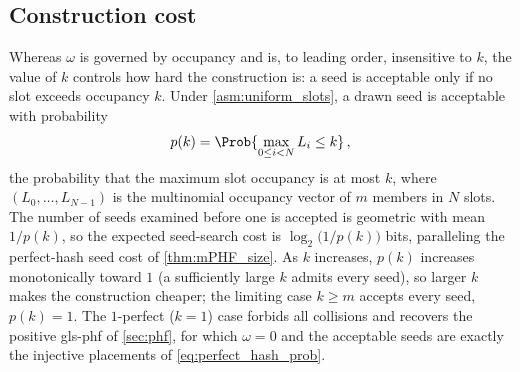 \documentclass[ ../main.tex]{subfiles}
\begin{document}
\subsection{Construction cost}
\label{sec:k_construction}
Whereas $\omega$ is governed by occupancy and is, to leading order, insensitive to $k$, the value of $k$ controls how hard the construction is: a seed is acceptable only if no slot exceeds occupancy $k$. Under \cref{asm:uniform_slots}, a drawn seed is acceptable with probability
\begin{equation}
\label{eq:k_accept}
    p(k) = \Prob{\max_{0 \le i < N} L_i \le k}\,,
\end{equation}
the probability that the maximum slot occupancy is at most $k$, where $(L_0,\ldots,L_{N-1})$ is the multinomial occupancy vector of $m$ members in $N$ slots. The number of seeds examined before one is accepted is geometric with mean $1/p(k)$, so the expected seed-search cost is $\log_2\bigl(1/p(k)\bigr)$ bits, paralleling the perfect-hash seed cost of \cref{thm:mPHF_size}. As $k$ increases, $p(k)$ increases monotonically toward $1$ (a sufficiently large $k$ admits every seed), so larger $k$ makes the construction cheaper; the limiting case $k \ge m$ accepts every seed, $p(k) = 1$. The $1$-perfect ($k=1$) case forbids all collisions and recovers the positive \gls{gls-phf} of \cref{sec:phf}, for which $\omega = 0$ and the acceptable seeds are exactly the injective placements of \cref{eq:perfect_hash_prob}.
\end{document}
